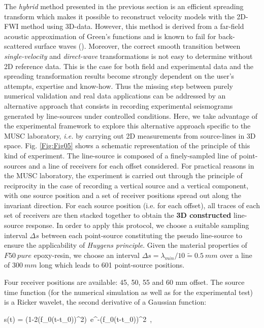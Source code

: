 \documentclass[extra,mreferee]{gji}
\newenvironment{violetnote}{\par\color{BlueViolet}}{\par}
\begin{document}
\begin{violetnote}
The \textit{hybrid} method presented in the previous section is an efficient spreading transform which makes it possible to reconstruct velocity models with the 2D-FWI method using 3D-data. However, this method is derived from a far-field acoustic approximation of Green's functions and is known to fail for back-scattered surface waves (\cite{schafer_lss_2014,groos2014role}). Moreover, the correct smooth transition between \textit{single-velocity} and \textit{direct-wave} transformations is not easy to determine without 2D reference data. This is the case for both field and experimental data and the spreading transformation results become strongly dependent on the user's attempts, expertise and know-how.
Thus the missing step between purely numerical validation and real data applications can be addressed by an alternative approach that consists in recording experimental seismograms generated by line-sources under controlled conditions. Here, we take advantage of the experimental framework to explore this alternative approach specific to the MUSC laboratory, \textit{i.e.} by carrying out 2D measurements from source-lines in 3D space. Fig. \ref{Fig:Fig05} shows a schematic representation of the principle of this kind of experiment. The line-source is composed of a finely-sampled line of point-sources and a line of receivers for each offset considered. 
For practical reasons in the MUSC laboratory, the experiment is carried out through the principle of reciprocity in the case of recording a vertical source and a vertical component, with one source position and a set of receiver positions spread out along the invariant direction. For each source position (i.e. for each offset), all traces of each set of receivers are then stacked together to obtain the \textbf{3D constructed} line-source response. In order to apply this protocol, we choose a suitable sampling interval $\Delta s$ between each point-source constituting the pseudo line-source to ensure the applicability of \textit{Huygens principle}. Given the material properties of $F50\ pure$ epoxy-resin, we choose an interval $\Delta s=\lambda_{min}/10 \tilde{=}0.5\ mm$ over a line of $300\ mm$ long which leads to 601 point-source positions.

Four receiver positions are available: 45, 50, 55 and 60 mm offset. The source time function (for the numerical simulation as well as for the experimental test) is a Ricker wavelet, the second derivative of a Gaussian function:

\equation
s(t) = (1-2(\pi f_{0}(t-t_{0}))^{2})~e^{-(\pi f_{0}(t-t_{0}))^{2}}~,
\label{eq:ricker-source} 
\endequation


\end{violetnote}
\end{document}
